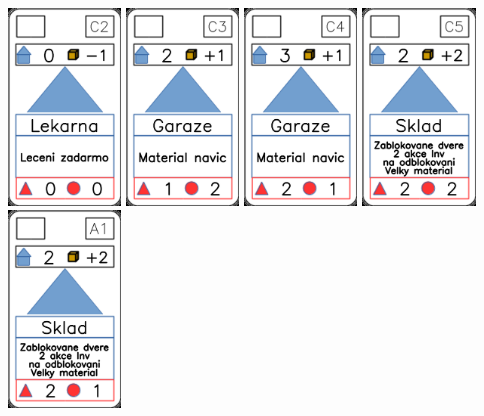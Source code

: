 \documentclass[a4paper]{article}
\begin{document}
	\includegraphics[width=3.0cm]{img-3_11}
	\includegraphics[width=3.0cm]{img-3_12}
	\includegraphics[width=3.0cm]{img-3_13}
	\includegraphics[width=3.0cm]{img-3_14}
	\includegraphics[width=3.0cm]{img-3_15}
\end{document}
